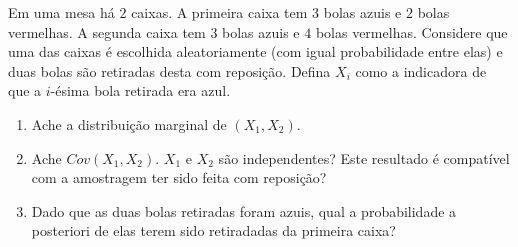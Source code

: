 \begin{exercise}
 Em uma mesa há $2$ caixas.
 A primeira caixa tem
 $3$ bolas azuis e $2$ bolas vermelhas.
 A segunda caixa tem
 $3$ bolas azuis e $4$ bolas vermelhas.
 Considere que uma das caixas é escolhida aleatoriamente
 (com igual probabilidade entre elas) e 
 duas bolas são retiradas desta com reposição.
 Defina $X_{i}$ como a indicadora de que
 a $i$-ésima bola retirada era azul.
 \begin{enumerate}[label=(\alph*)]
  \item Ache a distribuição marginal de
  $(X_{1},X_{2})$.
  \item Ache $Cov(X_{1},X_{2})$.
  $X_{1}$ e $X_{2}$ são independentes?
  Este resultado é compatível com
  a amostragem ter sido feita com reposição?
  \item Dado que as duas bolas retiradas foram azuis,
  qual a probabilidade a posteriori de
  elas terem sido retiradadas da primeira caixa?
 \end{enumerate}
\end{exercise}

